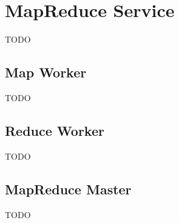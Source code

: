 \section{MapReduce Service}
TODO

\subsection{Map Worker}
TODO

\subsection{Reduce Worker}
TODO

\subsection{MapReduce Master}
TODO